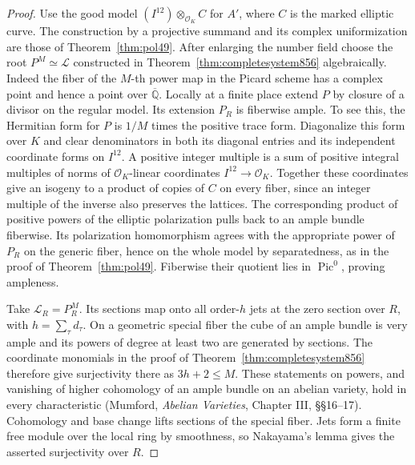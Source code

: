 \documentclass[a4paper,11pt]{article}
\theoremstyle{definition}
\theoremstyle{remark}
\numberwithin{equation}{section}
\begin{document}
\begin{proof}
Use the good model \((I^{12})\otimes_{\mathcal O_K}C\) for \(A'\),
where \(C\) is the marked elliptic curve. The construction by a
projective summand and its complex uniformization are those of
Theorem~\ref{thm:pol49}. After enlarging the number field
choose the root \(P^M\simeq\mathcal L\) constructed in
Theorem~\ref{thm:completesystem856} algebraically. Indeed the
fiber of the \(M\)-th power map in the Picard scheme has a complex
point and hence a point over \(\overline{\mathbb Q}\).
Locally at a finite place extend \(P\) by closure of a divisor
on the regular model. Its extension \(P_R\) is fiberwise ample.
To see this, the Hermitian form for \(P\) is \(1/M\) times
the positive trace form. Diagonalize this form over \(K\)
and clear denominators in both its diagonal entries and its
independent coordinate forms on \(I^{12}\). A positive integer
multiple is a sum of positive integral multiples of norms of
\(\mathcal O_K\)-linear coordinates \(I^{12}\to\mathcal O_K\).
Together these coordinates give an isogeny to a product of
copies of \(C\) on every fiber, since an integer multiple of
the inverse also preserves the lattices. The corresponding
product of positive powers of the elliptic polarization pulls
back to an ample bundle fiberwise. Its polarization homomorphism
agrees with the appropriate power of \(P_R\) on the generic
fiber, hence on the whole model by separatedness, as in the
proof of Theorem~\ref{thm:pol49}. Fiberwise their quotient
lies in \(\operatorname{Pic}^0\), proving ampleness.

Take \(\mathcal L_R=P_R^M\). Its sections map onto all
order-\(h\) jets at the zero section over \(R\), with
\(h=\sum_\tau d_\tau\). On a geometric special fiber the
cube of an ample bundle is very ample and its powers of
degree at least two are generated by sections. The coordinate
monomials in the proof of Theorem~\ref{thm:completesystem856}
therefore give surjectivity there as \(3h+2\le M\). These
statements on powers, and vanishing of higher cohomology of
an ample bundle on an abelian variety, hold in every
characteristic (Mumford, \emph{Abelian Varieties}, Chapter III,
\S\S16--17). Cohomology and base change lifts sections of
the special fiber. Jets form a finite free module over the
local ring by smoothness, so Nakayama's lemma gives the
asserted surjectivity over \(R\).


\end{proof}
\end{document}
